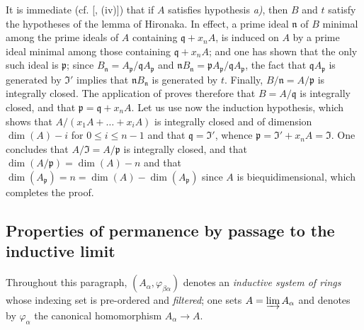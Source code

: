 It is immediate (cf. [, (iv)]) that if $A$ satisfies hypothesis \emph{a)}, then $B$ and $t$ satisfy the hypotheses of the lemma of Hironaka.
In effect, a prime ideal $\mathfrak{n}$ of $B$ minimal among the prime ideals of $A$ containing $\mathfrak{q}+x_nA$, is induced on $A$ by a prime ideal minimal among those containing $\mathfrak{q}+x_nA$; and one has shown that the only such ideal is $\mathfrak{p}$; since $B_\mathfrak{n}=A_\mathfrak{p}/\mathfrak{q}A_\mathfrak{p}$ and $\mathfrak{n}B_\mathfrak{n}=\mathfrak{p}A_\mathfrak{p}/\mathfrak{q}A_\mathfrak{p}$, the fact that $\mathfrak{q}A_\mathfrak{p}$ is generated by $\mathfrak{I}'$ implies that $\mathfrak{n}B_\mathfrak{n}$ is generated by $t$.
Finally, $B/\mathfrak{n}=A/\mathfrak{p}$ is integrally closed.
The application of  proves therefore that $B=A/\mathfrak{q}$ is integrally closed, and that $\mathfrak{p}=\mathfrak{q}+x_nA$.
Let us use now the induction hypothesis, which shows that $A/(x_1A+\ldots+x_iA)$ is integrally closed and of dimension $\dim(A)-i$ for $0\leqslant i\leqslant n-1$ and that $\mathfrak{q}=\mathfrak{I}'$, whence $\mathfrak{p}=\mathfrak{I}'+x_nA=\mathfrak{I}$.
One concludes that $A/\mathfrak{I}=A/\mathfrak{p}$ is integrally closed, and that $\dim(A/\mathfrak{p})=\dim(A)-n$ and that $\dim(A_\mathfrak{p})=n=\dim(A)-\dim(A_\mathfrak{p})$ since $A$ is biequidimensional, which completes the proof.


\subsection{Properties of permanence by passage to the inductive limit}
\label{subsection:IV.5.13}


Throughout this paragraph, $(A_\alpha,\varphi_{\beta\alpha})$ denotes an \emph{inductive system of rings} whose indexing set is pre-ordered and \emph{filtered}; one sets $A=\varinjlim A_\alpha$ and denotes by $\varphi_\alpha$ the canonical homomorphism $A_\alpha\to A$.

